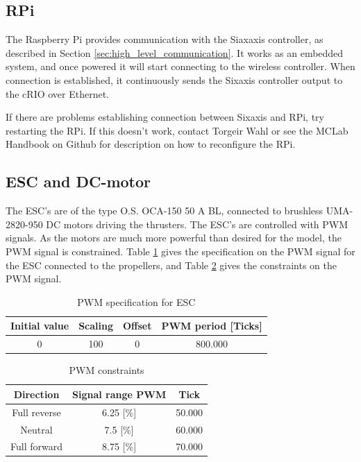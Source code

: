 \subsection{RPi}
The Raspberry Pi provides communication with the Siaxaxis controller, as described in Section \ref{sec:high_level_communication}. It works as an embedded system, and once powered it will start connecting to the wireless controller. When connection is established, it continuously sends the Sixaxis controller output to the cRIO over Ethernet. 

If there are problems establishing connection between Sixaxis and RPi, try restarting the RPi. If this doesn't work, contact Torgeir Wahl or see the MCLab Handbook on Github for description on how to reconfigure the RPi.
\subsection{ESC and DC-motor}
The ESC's are of the type O.S. OCA-150 50 A BL, connected to brushless UMA-2820-950 DC motors driving the thrusters. The ESC's are controlled with PWM signals. As the motors are much more powerful than desired for the model, the PWM signal is constrained. Table \ref{tab:pwm_spec} gives the specification on the PWM signal for the ESC connected to the propellers, and Table \ref{tab:PWM_constraints} gives the constraints on the PWM signal. 
\begin{table}[h!]
	\centering
	\caption{PWM specification for ESC}
	\label{tab:pwm_spec}
	\begin{tabular}{cccc}
		\hline
		\textbf{Initial value} & \textbf{Scaling} & \textbf{Offset} & \textbf{PWM period} [Ticks] \\ \hline
		0 & 100 & 0 & 800.000\\ \hline
	\end{tabular}
\end{table}
\begin{table}[htb!]
	\centering
	\caption{PWM constraints}
	\begin{tabular}{ccc}
		\hline
		\textbf{Direction} & \textbf{Signal range PWM} & Tick\\ \hline
		Full reverse & 6.25 [\%] & 50.000\\
		Neutral & 7.5 [\%] & 60.000\\
		Full forward & 8.75 [\%] & 70.000\\ \hline
	\end{tabular}
	\label{tab:PWM_constraints}
\end{table}
